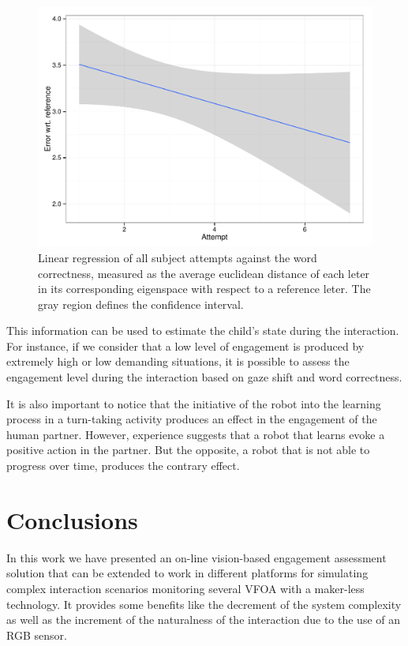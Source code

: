 \documentclass{sig-alternate}
\begin{document}
\begin{figure}
    \centering
    \includegraphics[width=0.9\columnwidth]{errorR}
    \caption{\small Linear regression of all subject attempts against the word correctness, measured as the average euclidean distance of each leter in its corresponding eigenspace with respect to a reference leter. The gray region defines the confidence interval.}
    \label{fig:errorR}
\end{figure}


This information can be used to estimate the child's state during the interaction. For instance, if we consider that a low level of engagement is produced by extremely high or low demanding situations, it is possible to assess the engagement level during the interaction based on gaze shift and word correctness.

It is also important to notice that the initiative of the robot into the learning process in a turn-taking activity produces an effect in the engagement of the human partner. However, experience suggests that a robot that learns evoke a positive action in the partner. But the opposite, a robot that is not able to progress over time, produces the contrary effect.



\section{Conclusions}
In this work we have presented an on-line vision-based engagement assessment solution that can be extended to work in different platforms for simulating complex interaction scenarios monitoring several VFOA with a maker-less technology. It provides some benefits like the decrement of the system complexity as well as the increment of the naturalness of the interaction due to the use of an RGB sensor.  
\end{document}
